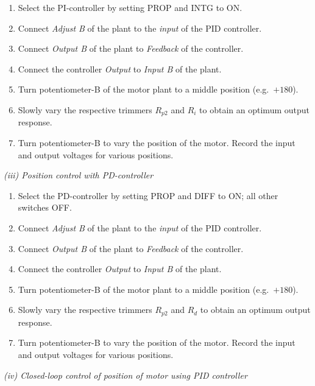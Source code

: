 \begin{procedure}
  \begin{enumerate}
    \item Select the PI-controller by setting PROP and INTG to ON.
    \item Connect \textit{Adjust B} of the plant to the \textit{input} of the PID controller.
    \item Connect \textit{Output B} of the plant to \textit{Feedback} of the controller.
    \item Connect the controller \textit{Output} to \textit{Input B} of the plant.
    \item Turn potentiometer-B of the motor plant to a middle position (e.g.\ $+180$).
    \item Slowly vary the respective trimmers $R_{p2}$ and $R_i$ to obtain an optimum output response.
    \item Turn potentiometer-B to vary the position of the motor. Record the input and output voltages for various positions.
  \end{enumerate}

  \textit{(iii) Position control with PD-controller}\vspace{2pt}

  \begin{enumerate}
    \item Select the PD-controller by setting PROP and DIFF to ON; all other switches OFF.
    \item Connect \textit{Adjust B} of the plant to the \textit{input} of the PID controller.
    \item Connect \textit{Output B} of the plant to \textit{Feedback} of the controller.
    \item Connect the controller \textit{Output} to \textit{Input B} of the plant.
    \item Turn potentiometer-B of the motor plant to a middle position (e.g.\ $+180$).
    \item Slowly vary the respective trimmers $R_{p2}$ and $R_d$ to obtain an optimum output response.
    \item Turn potentiometer-B to vary the position of the motor. Record the input and output voltages for various positions.
  \end{enumerate}
  \newpage

  \textit{(iv) Closed-loop control of position of motor using PID controller}\vspace{2pt}


\end{procedure}
